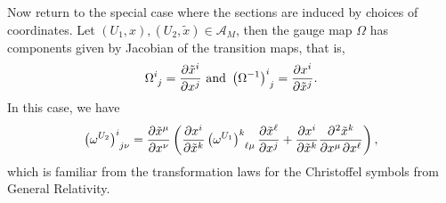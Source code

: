 Now return to the special case where the sections are induced by choices of coordinates. Let \((U_1, x), (U_2, \tilde{x}) \in \mathscr{A}_M\), then the gauge map \(\Omega\) has components given by Jacobian of the transition maps, that is,
\begin{equation*}
    \Omega\indices{^i_j} = \diffp{\tilde{x}^i}{x^j}\text{ and }\left(\Omega^{-1}\right)\indices{^i_j} = \diffp{x^i}{\tilde{x}^j}.
\end{equation*}
In this case, we have
\begin{equation*}
    \left(\omega^{U_2}\right)\indices{^i_{j\nu}} = \diffp{\tilde{x}^\mu}{x^\nu}\left(\diffp{x^i}{\tilde{x}^k}\left(\omega^{U_1}\right)\indices{^k_{\ell\mu}}\diffp{\tilde{x}^\ell}{x^j} + \diffp{x^i}{\tilde{x}^k}\diffp[1,1]{\tilde{x}^k}{x^\mu, x^\ell}\right),
\end{equation*}
which is familiar from the transformation laws for the Christoffel symbols from General Relativity.
